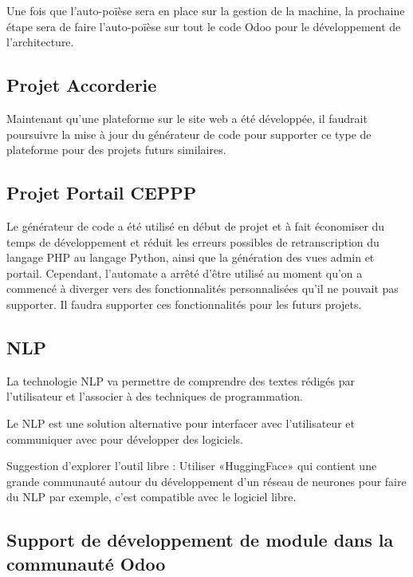 Une fois que l’auto-poïèse sera en place sur la gestion de la machine, la prochaine étape sera de faire l’auto-poïèse sur tout le code Odoo pour le développement de l’architecture.

\subsection{Projet Accorderie}
Maintenant qu’une plateforme sur le site web a été développée, il faudrait poursuivre la mise à jour du générateur de code pour supporter ce type de plateforme pour des projets futurs similaires.

\subsection{Projet Portail CEPPP}
Le générateur de code a été utilisé en début de projet et à fait économiser du temps de développement et réduit les erreurs possibles de retranscription du langage PHP au langage Python, ainsi que la génération des vues admin et portail. Cependant, l’automate a arrêté d’être utilisé au moment qu’on a commencé à diverger vers des fonctionnalités personnalisées qu’il ne pouvait pas supporter. Il faudra supporter ces fonctionnalités pour les futurs projets.

\subsection{NLP}
La technologie NLP va permettre de comprendre des textes rédigés par l’utilisateur et l’associer à des techniques de programmation.



Le NLP est une solution alternative pour interfacer avec l’utilisateur et communiquer avec pour développer des logiciels.

Suggestion d’explorer l’outil libre : Utiliser «HuggingFace» qui contient une grande communauté autour du développement d’un réseau de neurones pour faire du NLP par exemple, c’est compatible avec le logiciel libre.

\subsection{Support de développement de module dans la communauté Odoo}

